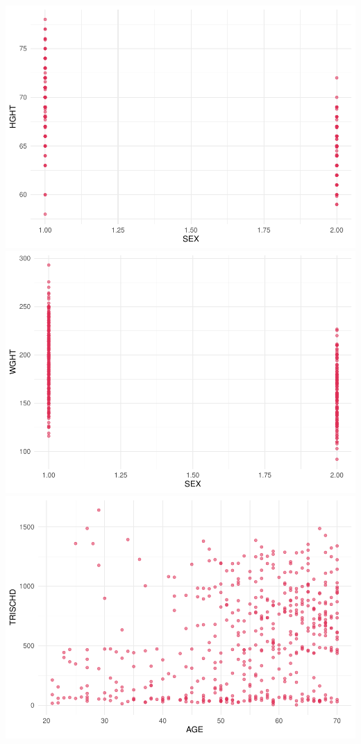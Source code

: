 \documentclass[
]{article}
\begin{document}
\includegraphics{Q1_markdown_files/figure-latex/unnamed-chunk-7-1.pdf}
\includegraphics{Q1_markdown_files/figure-latex/unnamed-chunk-7-2.pdf}
\includegraphics{Q1_markdown_files/figure-latex/unnamed-chunk-7-3.pdf}
\end{document}

